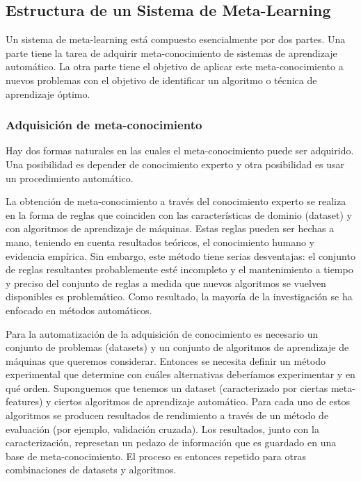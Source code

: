 \subsection{Estructura de un Sistema de Meta-Learning}

Un sistema de meta-learning está compuesto esencialmente por dos partes. Una parte tiene la tarea de adquirir meta-conocimiento de sistemas de aprendizaje automático. La otra parte tiene el objetivo de aplicar este meta-conocimiento a nuevos problemas con el objetivo de identificar un algoritmo o técnica de aprendizaje óptimo.

\subsubsection{Adquisición de meta-conocimiento} 

Hay dos formas naturales en las cuales el meta-conocimiento puede ser adquirido. Una posibilidad es depender de conocimiento experto y otra posibilidad es usar un procedimiento automático. 

La obtención de meta-conocimiento a través del conocimiento experto se realiza en la forma de reglas que coinciden con las características de dominio (dataset) y con algoritmos de aprendizaje de máquinas. Estas reglas pueden ser hechas a mano, teniendo en cuenta resultados teóricos, el conocimiento humano y evidencia empírica. Sin embargo, este método tiene serias desventajas: el conjunto de reglas resultantes probablemente esté incompleto y el mantenimiento a tiempo y preciso del conjunto de reglas a medida que nuevos algoritmos se vuelven disponibles es problemático. Como resultado, la mayoría de la investigación se ha enfocado en métodos automáticos.
	
Para la automatización de la adquisición de conocimiento es necesario un conjunto de problemas (datasets) y un conjunto de algoritmos de aprendizaje de máquinas que queremos considerar. Entonces se necesita definir un método experimental que determine con cuáles alternativas deberíamos experimentar y en qué orden. Suponguemos que tenemos un dataset (caracterizado por ciertas meta-features) y ciertos algoritmos de aprendizaje automático. Para cada uno de estos algoritmos se producen resultados de rendimiento a través de un método de evaluación (por ejemplo, validación cruzada). Los resultados, junto con la caracterización, represetan un pedazo de información que es guardado en una base de meta-conocimiento. El proceso es entonces repetido para otras combinaciones de datasets y algoritmos.

